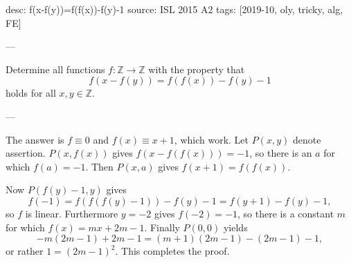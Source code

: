 desc: f(x-f(y))=f(f(x))-f(y)-1
source: ISL 2015 A2
tags: [2019-10, oly, tricky, alg, FE]

---

Determine all functions $f:\mathbb Z\to\mathbb Z$ with the property that \[f(x-f(y))=f(f(x))-f(y)-1\]
holds for all $x,y\in\mathbb Z$.

---

The answer is $f\equiv0$ and $f(x)\equiv x+1$, which work. Let $P(x,y)$ denote assertion. $P(x,f(x))$ gives $f(x-f(f(x)))=-1$, so there is an $a$ for which $f(a)=-1$. Then $P(x,a)$ gives $f(x+1)=f(f(x))$.

Now $P(f(y)-1,y)$ gives \[f(-1)=f(f(f(y)-1))-f(y)-1=f(y+1)-f(y)-1,\]
so $f$ is linear. Furthermore $y=-2$ gives $f(-2)=-1$, so there is a constant $m$ for which $f(x)=mx+2m-1$. Finally $P(0,0)$ yields \[-m(2m-1)+2m-1=(m+1)(2m-1)-(2m-1)-1,\]
or rather $1=(2m-1)^2$. This completes the proof.
